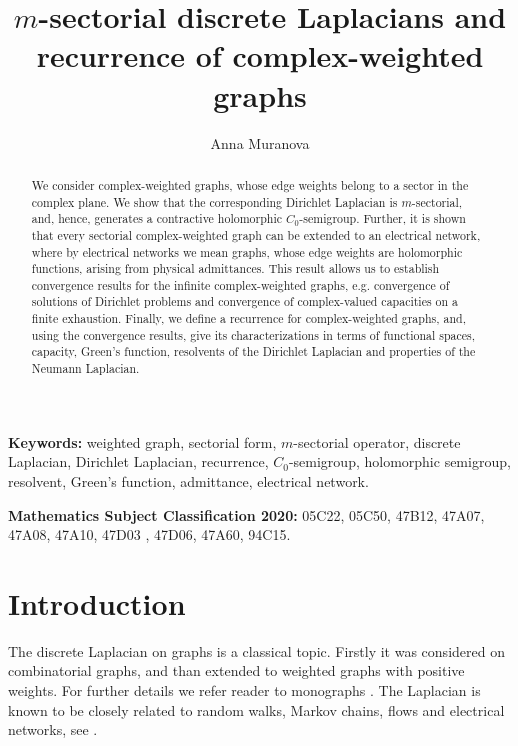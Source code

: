 \documentclass[a4paper,11pt]{amsart}
\author[A. Muranova]{Anna Muranova}
\title[$m$-sectorial Laplacians and recurrence]{$m$-sectorial discrete Laplacians and recurrence of complex-weighted graphs}
\theoremstyle{definition}
\begin{document}
                         
\maketitle



\begin{abstract}
We consider complex-weighted graphs, whose edge weights belong to a sector in the complex plane. We show that the corresponding Dirichlet Laplacian is $m$-sectorial, and, hence, generates a contractive holomorphic $C_0$-semigroup. Further, it is shown that every sectorial complex-weighted graph can be extended to an electrical network, where by electrical networks we mean graphs, whose edge weights are holomorphic functions, arising from physical admittances. This result allows us to    establish  convergence results for the infinite complex-weighted graphs, e.g. convergence of solutions of Dirichlet problems  and convergence of complex-valued capacities on a finite exhaustion. Finally, we define a recurrence for complex-weighted graphs, and, using the convergence results,  give its characterizations in terms of functional spaces, capacity, Green's function, resolvents of the Dirichlet Laplacian and properties of the Neumann Laplacian.
\end{abstract}

{\footnotesize
{\bf Keywords:} {weighted graph, sectorial form, $m$-sectorial operator, discrete Laplacian, Dirichlet Laplacian, recurrence, $C_0$-semigroup, holomorphic semigroup, resolvent, Green's function,  admittance,  electrical network.} 
\smallskip

{\bf Mathematics Subject Classification 2020:}{ 05C22, 05C50, 47B12, 47A07, 47A08, 47A10, 47D03 , 47D06,  47A60,  94C15.} 
}


\section{Introduction}
The discrete Laplacian on graphs is a classical topic. Firstly it was considered on combinatorial graphs, and than extended to weighted graphs with positive weights. For further details we refer reader to monographs \cite{Chung, Grigoryan, LPW, KellerLenzWojcBook}. The Laplacian is known to be closely related to random walks, Markov chains, flows and electrical networks, see \cite{DoyleSnell, LPW, Woess09, Woess00}. 
\end{document}
